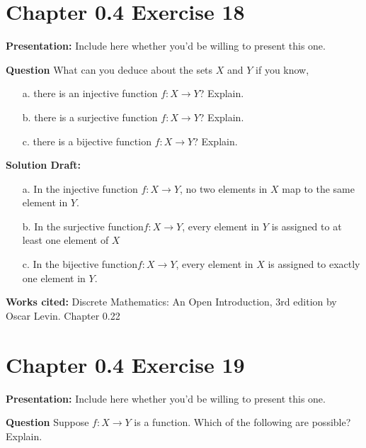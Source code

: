 \documentclass{article}
\begin{document}
\section*{Chapter 0.4 Exercise 18}  

\noindent\textbf{Presentation:} Include here whether you'd be willing to present this one. 

\vspace{0.5cm} %

\noindent\textbf{Question}
What can you deduce about the sets \(X\) and \(Y\) if you know,

\begin{enumerate}
    \item[a.] there is an injective function \(f : X \rightarrow Y\)? Explain.
    \item[b.] there is a surjective function \(f : X \rightarrow Y\)? Explain.
    \item[c.] there is a bijective function \(f : X \rightarrow Y\)? Explain.
\end{enumerate} 

\noindent\textbf{Solution Draft:} 

\begin{enumerate}
    \item[a.] In the injective function \(f : X \rightarrow Y\), no two elements in $X$ map to the same element in $Y$.
    \item[b.] In the surjective function\(f : X \rightarrow Y\), every element in $Y$ is assigned to at least one element of $X$
    \item[c.] In the bijective function\(f : X \rightarrow Y\), every element in $X$ is assigned to exactly one element in $Y$.
\end{enumerate} 
\vspace{0.5cm}
\textbf{Works cited:}
Discrete Mathematics: An Open Introduction, 3rd edition by Oscar Levin. Chapter 0.22
\section*{Chapter 0.4 Exercise 19}  

\noindent\textbf{Presentation:} Include here whether you'd be willing to present this one. 

\vspace{0.5cm} %

\noindent\textbf{Question}
Suppose \(f : X \rightarrow Y\) is a function. Which of the following are possible? Explain.
\end{document}
